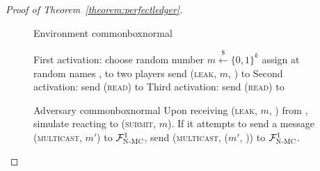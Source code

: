 \begin{proof}[Proof of Theorem~\ref{theorem:perfectledger}]
\begin{figure}[H]
\begin{titlebox}{Environment \normalfont \perfectenv}{commonbox}{normal}
\begin{algorithmic}[1]
            \State First activation:
            \Indent
              \State choose random number $m \overset{\$}{\gets} \{0, 1\}^k$
              \State assign at random names \alice, \bob{} to two players
              \State send (\textsc{leak}, $m$, \alice) to \adversary{}
            \EndIndent
            \State Second activation:
            \Indent
              \State send (\textsc{read}) to \bob
            \EndIndent
            \State Third activation:
            \Indent
                \State {} 
                \label{fig:perfectledger:env:coin1:real1}
                \State {} 
                \label{fig:perfectledger:env:coin1:ideal1}
              \EndIf
              \State send (\textsc{read}) to \alice
                \State {} 
                \label{fig:perfectledger:env:coin1:real3}
                \State {} 
                \label{fig:perfectledger:env:coin1:real2}
                \State {} 
                \label{fig:perfectledger:env:coin1:ideal2}
              \EndIf
            \EndIndent
          \EndProcedure
        \end{algorithmic}
      \end{titlebox}
      \caption{}
      \label{fig:perfectledger:env}
    \end{figure}

    \begin{figure}[H]
      \begin{titlebox}{Adversary \normalfont \perfectadv}{commonbox}{normal}
        Upon receiving (\textsc{leak}, $m$, \alice) from \perfectenv, simulate
        \perfectprot{} reacting to (\textsc{submit}, $m$). If it attempts to
        send a message (\textsc{multicast}, $m'$) to $\mathcal{F}_{\textsc{N-MC}}^1$, send
        (\textsc{multicast}, ($m'$, \alice)) to $\mathcal{F}_{\textsc{N-MC}}^1$.
      \end{titlebox}
      \caption{}
      \label{fig:perfectledger:adv}
    \end{figure}


\end{proof}
